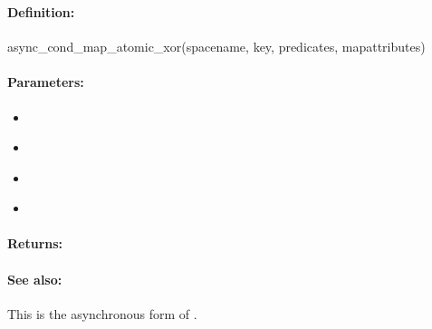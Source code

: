 \pagebreak
\subsubsection{}
\label{api:ruby:async_cond_map_atomic_xor}


\paragraph{Definition:}
\begin{rubycode}
async_cond_map_atomic_xor(spacename, key, predicates, mapattributes)
\end{rubycode}

\paragraph{Parameters:}
\begin{itemize}[noitemsep]
\item {}\\

\item {}\\

\item {}\\

\item {}\\

\end{itemize}

\paragraph{Returns:}


\paragraph{See also:}  This is the asynchronous form of .

\pagebreak
\subsubsection{}
\label{api:ruby:map_string_prepend}


